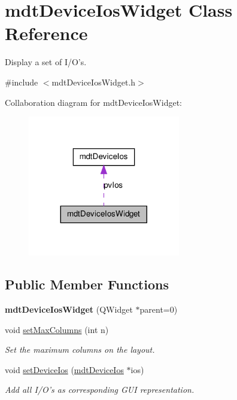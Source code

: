 \hypertarget{classmdt_device_ios_widget}{
\section{mdtDeviceIosWidget Class Reference}
\label{classmdt_device_ios_widget}
}


Display a set of I/O's.  




{\ttfamily \#include $<$mdtDeviceIosWidget.h$>$}



Collaboration diagram for mdtDeviceIosWidget:
\nopagebreak
\begin{figure}[H]
\begin{center}
\leavevmode
\includegraphics[width=188pt]{classmdt_device_ios_widget__coll__graph}
\end{center}
\end{figure}
\subsection*{Public Member Functions}
\begin{DoxyCompactItemize}
\item 
\hypertarget{classmdt_device_ios_widget_affd43c16896f0191038911231b52a1fd}{
{\bfseries mdtDeviceIosWidget} (QWidget $\ast$parent=0)}
\label{classmdt_device_ios_widget_affd43c16896f0191038911231b52a1fd}

\item 
void \hyperlink{classmdt_device_ios_widget_ad388c95b2bdb48bae976c3fbc2512c30}{setMaxColumns} (int n)
\begin{DoxyCompactList}\small\item\em Set the maximum columns on the layout. \end{DoxyCompactList}\item 
void \hyperlink{classmdt_device_ios_widget_a8fc261333ffc1c3b705ae8609f687159}{setDeviceIos} (\hyperlink{classmdt_device_ios}{mdtDeviceIos} $\ast$ios)
\begin{DoxyCompactList}\small\item\em Add all I/O's as corresponding GUI representation. \end{DoxyCompactList}\end{DoxyCompactItemize}


